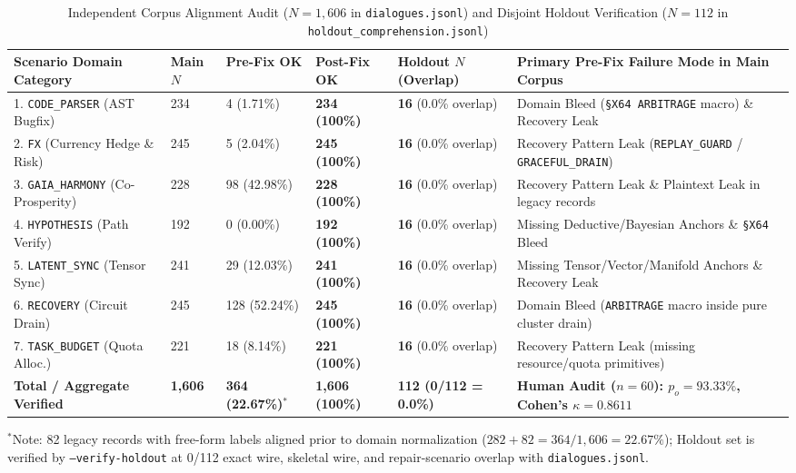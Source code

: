 \documentclass[9pt,a4paper]{extarticle}
\begin{document}
\begin{table}[h!]
\centering
\caption{Independent Corpus Alignment Audit ($N = 1{,}606$ in \texttt{dialogues.jsonl}) and Disjoint Holdout Verification ($N = 112$ in \texttt{holdout\_comprehension.jsonl})}
\label{tab:corpus_alignment}
\scriptsize
\renewcommand{\arraystretch}{0.88}
\setlength{\tabcolsep}{2.5pt}
\begin{tabularx}{\textwidth}{L{3.3cm} R{1.1cm} R{1.8cm} R{1.8cm} C{2.3cm} Y}
\toprule
{}
\textbf{\color{white}Scenario Domain Category} &
\textbf{\color{white}Main $N$} &
\textbf{\color{white}Pre-Fix OK} &
\textbf{\color{white}Post-Fix OK} &
\textbf{\color{white}Holdout $N$ (Overlap)} &
\textbf{\color{white}Primary Pre-Fix Failure Mode in Main Corpus} \\
. \texttt{CODE\_PARSER} (AST Bugfix) & 234 & 4 (1.71\%) & \textbf{234 (100\%)} & \textbf{16} (0.0\% overlap) & Domain Bleed (\texttt{\S X64 ARBITRAGE} macro) \& Recovery Leak \\
2. \texttt{FX} (Currency Hedge \& Risk) & 245 & 5 (2.04\%) & \textbf{245 (100\%)} & \textbf{16} (0.0\% overlap) & Recovery Pattern Leak (\texttt{REPLAY\_GUARD} / \texttt{GRACEFUL\_DRAIN}) \\
3. \texttt{GAIA\_HARMONY} (Co-Prosperity) & 228 & 98 (42.98\%) & \textbf{228 (100\%)} & \textbf{16} (0.0\% overlap) & Recovery Pattern Leak \& Plaintext Leak in legacy records \\
4. \texttt{HYPOTHESIS} (Path Verify) & 192 & 0 (0.00\%) & \textbf{192 (100\%)} & \textbf{16} (0.0\% overlap) & Missing Deductive/Bayesian Anchors \& \texttt{\S X64} Bleed \\
5. \texttt{LATENT\_SYNC} (Tensor Sync) & 241 & 29 (12.03\%) & \textbf{241 (100\%)} & \textbf{16} (0.0\% overlap) & Missing Tensor/Vector/Manifold Anchors \& Recovery Leak \\
6. \texttt{RECOVERY} (Circuit Drain) & 245 & 128 (52.24\%) & \textbf{245 (100\%)} & \textbf{16} (0.0\% overlap) & Domain Bleed (\texttt{ARBITRAGE} macro inside pure cluster drain) \\
7. \texttt{TASK\_BUDGET} (Quota Alloc.) & 221 & 18 (8.14\%) & \textbf{221 (100\%)} & \textbf{16} (0.0\% overlap) & Recovery Pattern Leak (missing resource/quota primitives) \\
\midrule
\textbf{Total / Aggregate Verified} & \textbf{1,606} & \textbf{364 (22.67\%)}$^*$ & \textbf{1,606 (100\%)} & \textbf{112 (0/112 = 0.0\%)} & \textbf{Human Audit ($n=60$): $p_o = 93.33\%$, Cohen's $\kappa = 0.8611$} \\
\bottomrule
\end{tabularx}
\vspace{0.8pt}
{\scriptsize $^*$Note: 82 legacy records with free-form labels aligned prior to domain normalization ($282 + 82 = 364/1{,}606 = 22.67\%$); Holdout set is verified by \texttt{--verify-holdout} at 0/112 exact wire, skeletal wire, and repair-scenario overlap with \texttt{dialogues.jsonl}.}
\end{table}
\end{document}
